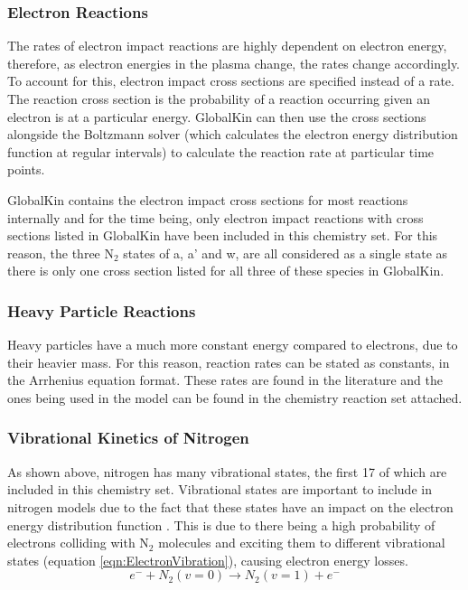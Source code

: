\documentclass[11pt, oneside]{article}   	%
\begin{document}
\subsubsection*{Electron Reactions}
The rates of electron impact reactions are highly dependent on electron energy, therefore, as electron energies in the plasma change, the rates change accordingly.
To account for this, electron impact cross sections are specified instead of a rate.
The reaction cross section is the probability of a reaction occurring given an electron is at a particular energy.
GlobalKin can then use the cross sections alongside the Boltzmann solver (which calculates the electron energy distribution function at regular intervals) to calculate the reaction rate at particular time points.

GlobalKin contains the electron impact cross sections for most reactions internally and for the time being, only electron impact reactions with cross sections listed in GlobalKin have been included in this chemistry set.
For this reason, the three N$_2$ states of a, a' and w, are all considered as a single state as there is only one cross section listed for all three of these species in GlobalKin.

\subsubsection*{Heavy Particle Reactions}
Heavy particles have a much more constant energy compared to electrons, due to their heavier mass. 
For this reason, reaction rates can be stated as constants, in the Arrhenius equation format.
These rates are found in the literature and the ones being used in the model can be found in the chemistry reaction set attached.


\subsubsection*{Vibrational Kinetics of Nitrogen}

As shown above, nitrogen has many vibrational states, the first 17 of which are included in this chemistry set.
Vibrational states are important to include in nitrogen models due to the fact that these states have an impact on the electron energy distribution function \cite{Guerra2004kinetic}.
This is due to there being a high probability of electrons colliding with N$_2$ molecules and exciting them to different vibrational states (equation \ref{eqn:ElectronVibration}), causing electron energy losses.
\begin{equation}
e^- + N_2(v=0) \rightarrow N_2(v=1) + e^-
\label{eqn:ElectronVibration}
\end{equation}
\end{document}

